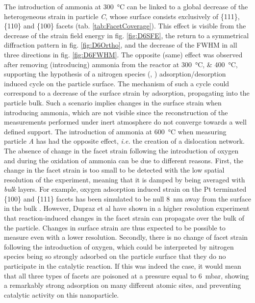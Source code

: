 The introduction of ammonia at \qty{300}{\degreeCelsius} can be linked to a global decrease of the heterogeneous strain in particle \textit{C}, whose surface consists exclusively of \{111\}, \{110\} and \{100\} facets (tab. \ref{tab:FacetCoverage}).
This effect is visible from the decrease of the strain field energy in fig. \ref{fig:D6SFE}, the return to a symmetrical diffraction pattern in fig. \ref{fig:D6Ortho}, and the decrease of the FWHM in all three directions in fig. \ref{fig:D6FWHM}.
The opposite (same) effect was observed after removing (introducing) ammonia from the reactor at \qtylist{300;400}{\degreeCelsius}, supporting the hypothesis of a nitrogen species (, ) adsorption/desorption induced cycle on the particle surface.
The mechanism of such a cycle could correspond to a decrease of the surface strain by adsorption, propagating into the particle bulk.
Such a scenario implies changes in the surface strain when introducing ammonia, which are not visible since the reconstruction of the measurements performed under inert atmosphere do not converge towards a well defined support.
The introduction of ammonia at \qty{600}{\degreeCelsius} when measuring particle \textit{A} has had the opposite effect, \textit{i.e.} the creation of a dislocation network.
The absence of change in the facet strain following the introduction of oxygen and during the oxidation of ammonia can be due to different reasons.
First, the change in the facet strain is too small to be detected with the low spatial resolution of the experiment, meaning that it is damped by being averaged with \textit{bulk} layers.
For example, oxygen adsorption induced strain on the Pt terminated \{100\} and \{111\} facets has been simulated to be null \qty{8}{\nm} away from the surface in the bulk \parencite{Kim2021}.
However, Dupraz et al \parencite*{Dupraz2022} have shown in a higher resolution experiment that reaction-induced changes in the facet strain can propagate over the bulk of the particle.
Changes in surface strain are thus expected to be possible to measure even with a lower resolution.
Secondly, there is no change of facet strain following the introduction of oxygen, which could be interpreted by nitrogen species being so strongly adsorbed on the particle surface that they do no participate in the catalytic reaction.
If this was indeed the case, it would mean that all three types of facets are poisoned at a  pressure equal to \qty{6}{\milli\bar}, showing a remarkably strong adsorption on many different atomic sites, and preventing catalytic activity on this nanoparticle.

